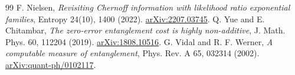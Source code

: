 \documentclass[11pt,a4paper]{article}
\theoremstyle{remark}\newtheorem{remark}[theorem]{Remark}
\begin{document}
\begin{thebibliography}{99}
 F. Nielsen, \emph{Revisiting Chernoff information with likelihood ratio exponential families}, Entropy 24(10), 1400 (2022). \href{https://arxiv.org/abs/2207.03745}{arXiv:2207.03745}.
 Q. Yue and E. Chitambar, \emph{The zero-error entanglement cost is highly non-additive}, J. Math. Phys. 60, 112204 (2019). \href{https://arxiv.org/abs/1808.10516}{arXiv:1808.10516}.
 G. Vidal and R. F. Werner, \emph{A computable measure of entanglement}, Phys. Rev. A 65, 032314 (2002). \href{https://arxiv.org/abs/quant-ph/0102117}{arXiv:quant-ph/0102117}.
\end{thebibliography}
\endgroup
\end{document}
